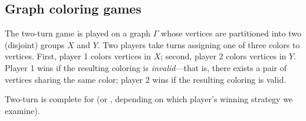 \subsection{Graph coloring games}

\begin{definition}%
  The two-turn  game is played on a graph \(\Gamma\) whose
  vertices are partitioned into two (disjoint) groups \(X\) and \(Y\).  Two
  players take turns assigning one of three colors to vertices.  First, player
  1 colors vertices in \(X\); second, player 2 colors  vertices in \(Y\).
  Player 1 wins if the resulting coloring is \emph{invalid}---that is, there
  exists a pair of vertices sharing the same color; player 2 wins if the
  resulting coloring is valid.

\end{definition}

\begin{conjecture}
  Two-turn  is complete for  (or , depending on
  which player's winning strategy we examine).
\end{conjecture}










%
%
%
%
%
%
%
%
%
%
%
%
%

